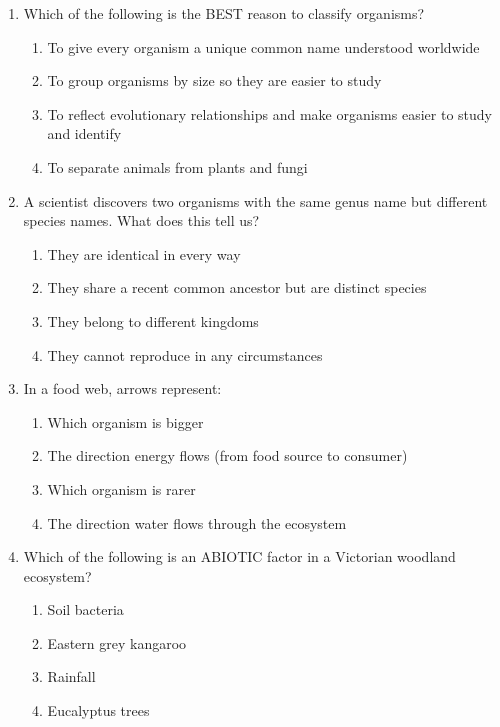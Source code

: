 \documentclass[11pt,a4paper]{article}
\begin{document}
\medskip
\begin{enumerate}[label=\textbf{\arabic*.}, itemsep=10pt]

\item Which of the following is the BEST reason to classify organisms?
\begin{enumerate}[label=\Alph*., itemsep=2pt]
  \item To give every organism a unique common name understood worldwide
  \item To group organisms by size so they are easier to study
  \item To reflect evolutionary relationships and make organisms easier to study and identify
  \item To separate animals from plants and fungi
\end{enumerate}

\item A scientist discovers two organisms with the same genus name but different species names. What does this tell us?
\begin{enumerate}[label=\Alph*., itemsep=2pt]
  \item They are identical in every way
  \item They share a recent common ancestor but are distinct species
  \item They belong to different kingdoms
  \item They cannot reproduce in any circumstances
\end{enumerate}

\item In a food web, arrows represent:
\begin{enumerate}[label=\Alph*., itemsep=2pt]
  \item Which organism is bigger
  \item The direction energy flows (from food source to consumer)
  \item Which organism is rarer
  \item The direction water flows through the ecosystem
\end{enumerate}

\item Which of the following is an ABIOTIC factor in a Victorian woodland ecosystem?
\begin{enumerate}[label=\Alph*., itemsep=2pt]
  \item Soil bacteria    \item Eastern grey kangaroo
  \item Rainfall         \item Eucalyptus trees
\end{enumerate}


\end{enumerate}
\end{document}
